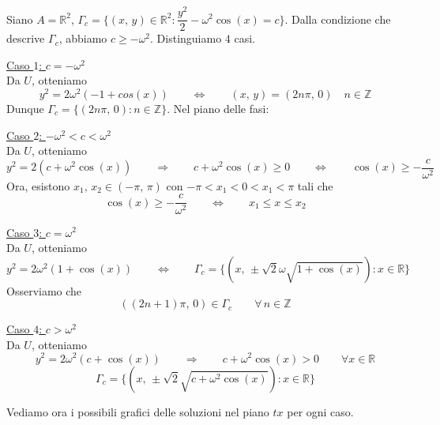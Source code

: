 Siano $A = \mathbb{R}^2$, $\Gamma_c = \lbrace (x,\,y) \in \mathbb{R}^2 : \dfrac{y^2}{2} - \omega^2\cos(x) = c \rbrace$. Dalla condizione che descrive $\Gamma_c$, abbiamo $c \geq -\omega^2$. Distinguiamo $4$ casi.

\underline{Caso $1$: $c = -\omega^2$}\\
Da $U$, otteniamo
$$
y^2 = 2\omega^2(-1+cos(x))
\qquad\Longleftrightarrow\qquad
(x,\,y) = (2n\pi,\,0) \quad n \in \mathbb{Z}
$$
Dunque $\Gamma_c = \lbrace (2n\pi,\,0) : n \in \mathbb{Z} \rbrace$. Nel piano delle fasi:
\begin{center}
\def\svgwidth{8cm}

\end{center}

\underline{Caso $2$: $-\omega^2 < c < \omega^2$}\\
Da $U$, otteniamo
$$
y^2 = 2(c+\omega^2\cos(x))
\qquad\Longrightarrow\qquad
c+\omega^2\cos(x) \geq 0
\qquad\Longleftrightarrow\qquad
\cos(x) \geq -\dfrac{c}{\omega^2}
$$
Ora, esistono $x_1,\,x_2 \in (-\pi,\,\pi)$ con $-\pi < x_1 < 0 < x_1 < \pi$ tali che
$$
\cos(x) \geq -\dfrac{c}{\omega^2}
\qquad\Longleftrightarrow\qquad
x_1 \leq x \leq x_2
$$
\begin{center}
\def\svgwidth{8cm}

\end{center}

\underline{Caso $3$: $c = \omega^2$}\\
Da $U$, otteniamo
$$
y^2 = 2\omega^2(1+\cos(x))
\qquad\Longleftrightarrow\qquad
\Gamma_c = \lbrace (x,\, \pm \sqrt{2}\omega\sqrt{1+\cos(x)}) : x \in \mathbb{R} \rbrace
$$
Osserviamo che
$$
((2n+1)\pi,\,0) \in \Gamma_c \qquad \forall \, n \in \mathbb{Z}
$$
\begin{center}
\def\svgwidth{8cm}

\end{center}

\underline{Caso $4$: $c > \omega^2$}\\
Da $U$, otteniamo
$$
y^2 = 2\omega^2(c+\cos(x))
\qquad\Longrightarrow\qquad
c+\omega^2\cos(x) > 0 \qquad \forall x \in \mathbb{R}
$$
$$
\Gamma_c = \lbrace (x,\, \pm \sqrt{2}\sqrt{c+\omega^2\cos(x)}) : x \in \mathbb{R} \rbrace
$$
\begin{center}
\def\svgwidth{8cm}

\end{center}

Vediamo ora i possibili grafici delle soluzioni nel piano $tx$ per ogni caso.

